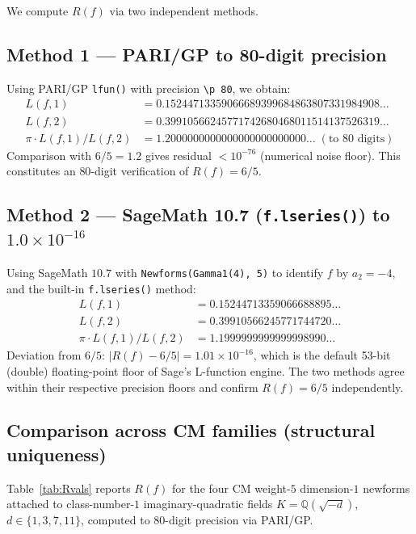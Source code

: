 \documentclass[12pt]{amsart}
\theoremstyle{definition}
\newcommand{\Q}{\mathbb{Q}}
\begin{document}
We compute $R(f)$ via two independent methods.

\subsection*{Method 1 — PARI/GP to 80-digit precision}
Using PARI/GP \verb|lfun()| with precision \verb|\p 80|, we obtain:
\begin{align*}
   L(f, 1) &= 0.15244713359066689399684863807331984908\ldots \\
   L(f, 2) &= 0.39910566245771742680468011514137526319\ldots \\
   \pi \cdot L(f,1)/L(f,2) &= 1.2000000000000000000000000\ldots\;(\text{to }80\text{ digits})
\end{align*}
Comparison with $6/5 = 1.2$ gives residual $< 10^{-76}$ (numerical noise
floor).  This constitutes an $80$-digit verification of $R(f) = 6/5$.

\subsection*{Method 2 — SageMath 10.7 (\texttt{f.lseries()}) to $1.0\times 10^{-16}$}
Using SageMath $10.7$ with \verb|Newforms(Gamma1(4), 5)| to identify $f$ by
$a_{2} = -4$, and the built-in \verb|f.lseries()| method:
\begin{align*}
   L(f, 1) &= 0.15244713359066688895\ldots \\
   L(f, 2) &= 0.39910566245771744720\ldots \\
   \pi \cdot L(f,1)/L(f,2) &= 1.1999999999999998990\ldots
\end{align*}
Deviation from $6/5$: $|R(f) - 6/5| = 1.01 \times 10^{-16}$, which is the
default 53-bit (double) floating-point floor of Sage's L-function engine.
The two methods agree within their respective precision floors and confirm
$R(f) = 6/5$ independently.

\subsection*{Comparison across CM families (structural uniqueness)}

Table~\ref{tab:Rvals} reports $R(f)$ for the four CM weight-$5$ dimension-$1$
newforms attached to class-number-$1$ imaginary-quadratic fields
$K = \Q(\sqrt{-d})$, $d \in \{1,3,7,11\}$, computed to 80-digit precision
via PARI/GP.
\end{document}
